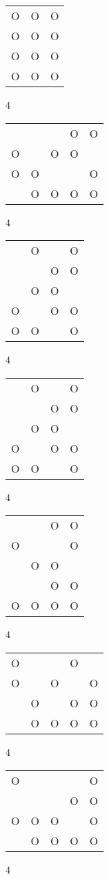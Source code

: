 \begin{tabular}{|m{0.2cm}m{0.2cm}m{0.2cm}|}\hline
O&O&O\\
O&O&O\\
O&O&O\\
O&O&O\\
\hline\end{tabular}4
\begin{tabular}{|m{0.2cm}m{0.2cm}m{0.2cm}m{0.2cm}m{0.2cm}|}\hline
 & & &O&O\\
O& &O&O& \\
O&O& & &O\\
 &O&O&O&O\\
\hline\end{tabular}4
\begin{tabular}{|m{0.2cm}m{0.2cm}m{0.2cm}m{0.2cm}|}\hline
 &O& &O\\
 & &O&O\\
 &O&O& \\
O& &O&O\\
O&O& &O\\
\hline\end{tabular}4
\begin{tabular}{|m{0.2cm}m{0.2cm}m{0.2cm}m{0.2cm}|}\hline
 &O& &O\\
 & &O&O\\
 &O&O& \\
O& &O&O\\
O&O& &O\\
\hline\end{tabular}4
\begin{tabular}{|m{0.2cm}m{0.2cm}m{0.2cm}m{0.2cm}|}\hline
 & &O&O\\
O& & &O\\
 &O&O& \\
 & &O&O\\
O&O&O&O\\
\hline\end{tabular}4
\begin{tabular}{|m{0.2cm}m{0.2cm}m{0.2cm}m{0.2cm}m{0.2cm}|}\hline
O& & &O& \\
O& &O& &O\\
 &O& &O&O\\
 &O&O&O&O\\
\hline\end{tabular}4
\begin{tabular}{|m{0.2cm}m{0.2cm}m{0.2cm}m{0.2cm}m{0.2cm}|}\hline
O& & & &O\\
 & & &O&O\\
O&O&O& &O\\
 &O&O&O&O\\
\hline\end{tabular}4
